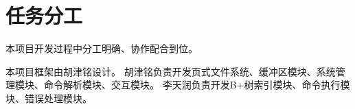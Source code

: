 \section{任务分工}
    本项目开发过程中分工明确、协作配合到位。

    本项目框架由胡津铭设计。%
    胡津铭负责开发页式文件系统、缓冲区模块、系统管理模块、命令解析模块、交互模块。%
    李天润负责开发B+树索引模块、命令执行模块、错误处理模块。
